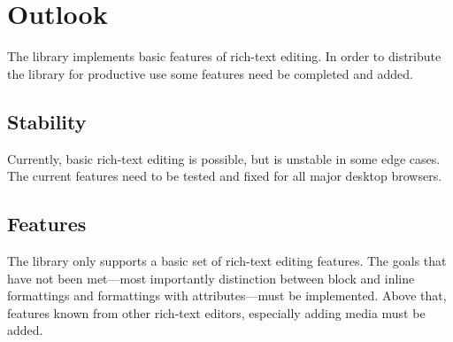 



\chapter{Outlook}

The library implements basic features of rich-text editing. In order to distribute the library for productive use some features need be completed and added.

\section{Stability}

Currently, basic rich-text editing is possible, but is unstable in some edge cases. The current features need to be tested and fixed for all major desktop browsers.

\section{Features}

The library only supports a basic set of rich-text editing features. The goals that have not been met---most importantly distinction between block and inline formattings and formattings with attributes---must be implemented. Above that, features known from other rich-text editors, especially adding media must be added.

